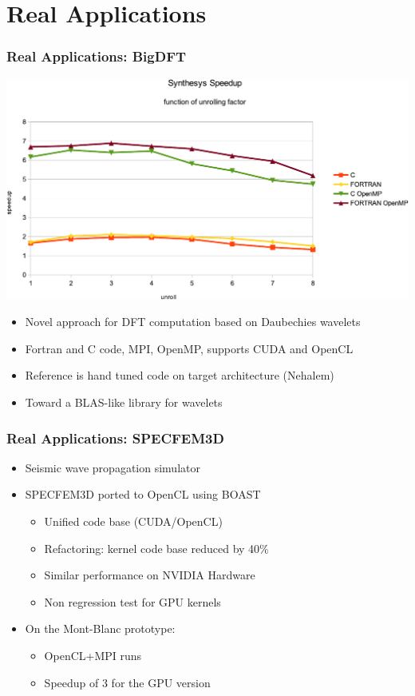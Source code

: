 \documentclass{beamer}
\begin{document}
\section{Real Applications}

\begin{frame}
  \frametitle{Real Applications: BigDFT}
  \begin{center}
    \includegraphics[scale=0.35]{Res_synthesis}
  \end{center}

 \begin{itemize}
  \item Novel approach for DFT computation based on Daubechies wavelets
  \item Fortran and C code, MPI, OpenMP, supports CUDA and OpenCL
   \item Reference is hand tuned code on target architecture (Nehalem)
    \item Toward a BLAS-like library for wavelets
  \end{itemize}
\end{frame}

\begin{frame}
  \frametitle{Real Applications: SPECFEM3D}

  \begin{itemize}
   \item Seismic wave propagation simulator
    \item SPECFEM3D ported to OpenCL using BOAST
    \begin{itemize}
      \item Unified code base (CUDA/OpenCL)
      \item Refactoring: kernel code base reduced by 40\%
      \item Similar performance on NVIDIA Hardware
      \item Non regression test for GPU kernels
    \end{itemize}
    \item On the Mont-Blanc prototype:
    \begin{itemize}
      \item OpenCL+MPI runs
      \item Speedup of 3 for the GPU version
    \end{itemize}
  \end{itemize}
\end{frame}
\end{document}
